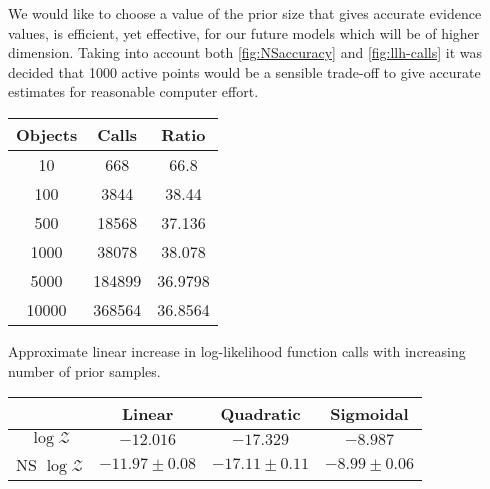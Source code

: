 We would like to choose a value of the prior size that gives accurate evidence values, is efficient, yet effective, for our future models which will be of higher dimension.
Taking into account both \autoref{fig:NSaccuracy} and \autoref{fig:llh-calls} it was decided that 1000 active points would be a sensible trade-off to give accurate estimates for reasonable computer effort.
\begin{margintable}[-215pt]
  \begin{tabular}{@{}ccc@{}}
    \toprule
    Objects & Calls & Ratio\\
    \midrule
    10 & 668 & 66.8\\
    100 & 3844 & 38.44\\
    500 & 18568 & 37.136\\
    1000 & 38078 & 38.078\\
    5000 & 184899 & 36.9798\\
    10000 & 368564 & 36.8564\\
    \bottomrule
  \end{tabular}
  \caption{Approximate linear increase in log-likelihood function calls with increasing number of prior samples.
  }
  \label{tab:obj-evals}
\end{margintable}

\begin{table}[htbp]
  \centering
  \begin{tabular}{cccc}%
    \toprule
    & Linear & Quadratic & Sigmoidal\\
    \midrule
    $\log\mathcal Z$ & $-12.016$ & $-17.329$ & $-8.987$ \\
    NS $\log\mathcal Z$ & $-11.97 \pm 0.08$ & $-17.11\pm 0.11$ & $-8.99\pm 0.06$\\
    \bottomrule
  \end{tabular}
\end{table}
  
